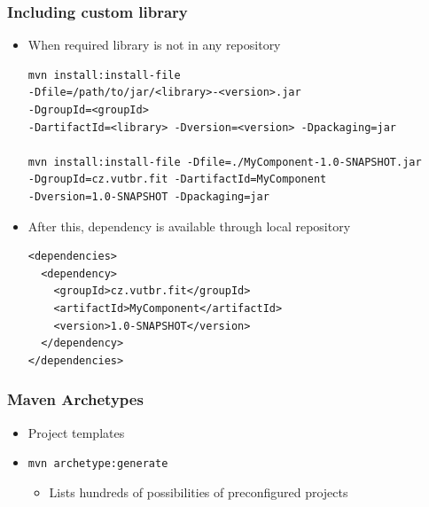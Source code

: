 \documentclass[10pt,xcolor=pdflatex]{beamer}
\begin{document}
\begin{frame}[containsverbatim]\frametitle{Including custom library}
\begin{itemize}
  \item When required library is not in any repository
    \begin{footnotesize}
    \begin{verbatim}
mvn install:install-file 
-Dfile=/path/to/jar/<library>-<version>.jar 
-DgroupId=<groupId> 
-DartifactId=<library> -Dversion=<version> -Dpackaging=jar

mvn install:install-file -Dfile=./MyComponent-1.0-SNAPSHOT.jar 
-DgroupId=cz.vutbr.fit -DartifactId=MyComponent 
-Dversion=1.0-SNAPSHOT -Dpackaging=jar
    \end{verbatim}
    \end{footnotesize}
  \item After this, dependency is available through local repository
    \begin{footnotesize}
    \begin{verbatim}
<dependencies>
  <dependency>  
    <groupId>cz.vutbr.fit</groupId>  
    <artifactId>MyComponent</artifactId>  
    <version>1.0-SNAPSHOT</version>
  </dependency>
</dependencies>
    \end{verbatim}
    \end{footnotesize}
\end{itemize}
\end{frame}

\begin{frame}[containsverbatim]\frametitle{Maven Archetypes}
\begin{itemize}
	\item Project templates
	\item \texttt{mvn archetype:generate}
      \begin{itemize}
        \item Lists hundreds of possibilities of preconfigured projects
      \end{itemize}
\end{itemize}
\end{frame}
\end{document}
